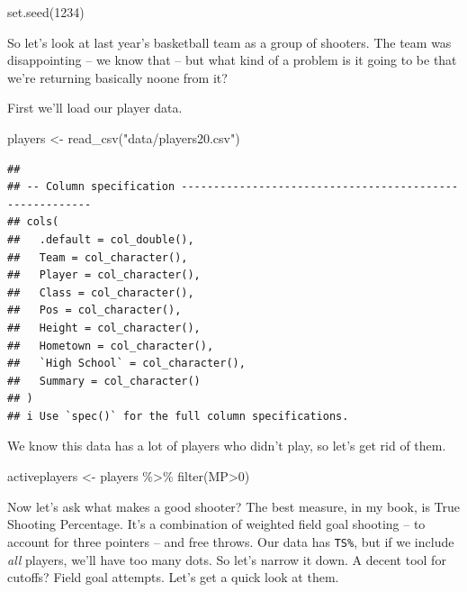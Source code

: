 \documentclass[
]{book}
\newenvironment{Shaded}{\begin{snugshade}}{\end{snugshade}}
\newcommand{\DecValTok}[1]{\textcolor[rgb]{0.00,0.00,0.81}{#1}}
\newcommand{\FunctionTok}[1]{\textcolor[rgb]{0.00,0.00,0.00}{#1}}
\newcommand{\NormalTok}[1]{#1}
\newcommand{\OtherTok}[1]{\textcolor[rgb]{0.56,0.35,0.01}{#1}}
\newcommand{\SpecialCharTok}[1]{\textcolor[rgb]{0.00,0.00,0.00}{#1}}
\newcommand{\StringTok}[1]{\textcolor[rgb]{0.31,0.60,0.02}{#1}}
\begin{document}
\begin{Shaded}
\begin{Highlighting}[]
\FunctionTok{set.seed}\NormalTok{(}\DecValTok{1234}\NormalTok{)}
\end{Highlighting}
\end{Shaded}

So let's look at last year's basketball team as a group of shooters. The team was disappointing -- we know that -- but what kind of a problem is it going to be that we're returning basically noone from it?

First we'll load our player data.

\begin{Shaded}
\begin{Highlighting}[]
\NormalTok{players }\OtherTok{\textless{}{-}} \FunctionTok{read\_csv}\NormalTok{(}\StringTok{"data/players20.csv"}\NormalTok{)}
\end{Highlighting}
\end{Shaded}

\begin{verbatim}
## 
## -- Column specification --------------------------------------------------------
## cols(
##   .default = col_double(),
##   Team = col_character(),
##   Player = col_character(),
##   Class = col_character(),
##   Pos = col_character(),
##   Height = col_character(),
##   Hometown = col_character(),
##   `High School` = col_character(),
##   Summary = col_character()
## )
## i Use `spec()` for the full column specifications.
\end{verbatim}

We know this data has a lot of players who didn't play, so let's get rid of them.

\begin{Shaded}
\begin{Highlighting}[]
\NormalTok{activeplayers }\OtherTok{\textless{}{-}}\NormalTok{ players }\SpecialCharTok{\%\textgreater{}\%} \FunctionTok{filter}\NormalTok{(MP}\SpecialCharTok{\textgreater{}}\DecValTok{0}\NormalTok{) }
\end{Highlighting}
\end{Shaded}

Now let's ask what makes a good shooter? The best measure, in my book, is True Shooting Percentage. It's a combination of weighted field goal shooting -- to account for three pointers -- and free throws. Our data has \texttt{TS\%}, but if we include \emph{all} players, we'll have too many dots. So let's narrow it down. A decent tool for cutoffs? Field goal attempts. Let's get a quick look at them.
\end{document}
